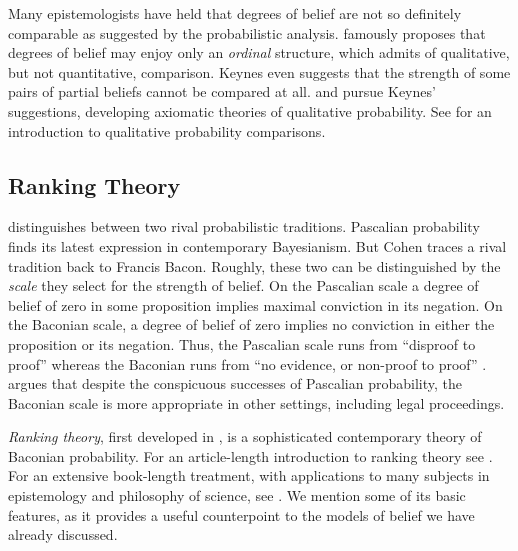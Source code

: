 Many epistemologists have held that degrees of belief are not so definitely
comparable as suggested by the probabilistic analysis.
\citet{keynes1921treatise} famously proposes that degrees of belief may enjoy
only an {\em ordinal} structure, which admits of qualitative, but not
quantitative, comparison. Keynes even suggests that the strength of some pairs
of partial beliefs cannot be compared at all. \citet{koopman1940axioms} and
\citet{fine1973theories} pursue Keynes' suggestions, developing axiomatic
theories of qualitative probability. See \citet{konek2019comparative} for an
introduction to qualitative probability comparisons. 

\subsection{Ranking Theory}
\label{rankingtheory}

 distinguishes between two rival
probabilistic traditions. Pascalian probability finds its latest expression in
contemporary Bayesianism. But Cohen traces a rival tradition back to Francis
Bacon. Roughly, these two can be distinguished by the {\em scale} they select
for the strength of belief. On the Pascalian scale a degree of belief of zero in
some proposition implies maximal conviction in its negation. On the Baconian
scale, a degree of belief of zero implies no conviction in either the
proposition or its negation. Thus, the Pascalian scale runs from ``disproof to
proof'' whereas the Baconian runs from ``no evidence, or non-proof to proof''
\citep[p. 224]{cohen1980some}.  \citet{cohen1977probable} argues that despite
the conspicuous successes of Pascalian probability, the Baconian scale is more
appropriate in other settings, including legal proceedings.

{\em Ranking theory}, first developed in \citet{spohn1988ordinal}, is a
sophisticated contemporary theory of Baconian probability. For an article-length
introduction to ranking theory see \citet{huber2013ranking, huber2019ranking}.
For an extensive book-length treatment, with applications to many subjects in
epistemology and philosophy of science, see \citet{spohn2012laws}. We mention
some of its basic features, as it provides a useful counterpoint to the models
of belief we have already discussed.

